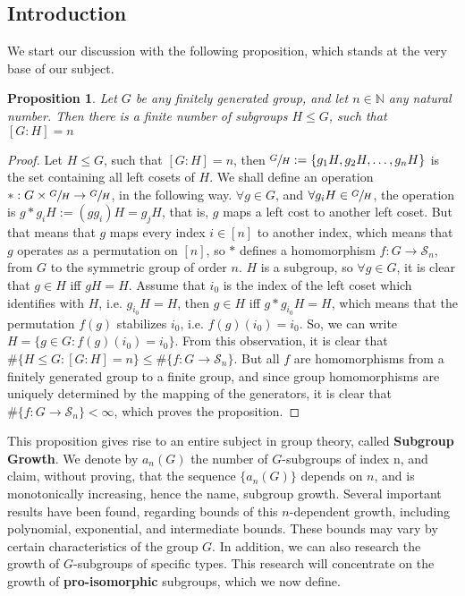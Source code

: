 \documentclass[12pt]{article}
\newtheorem{proposition}[theorem]{Proposition}
\begin{document}
\subsection{Introduction}
We start our discussion with the following proposition, which stands at the very base of our subject.
\begin{proposition} \label{prop:finite.number.subgroups}
Let $G$ be any finitely generated group, and let $n\in\mathbb{N}$ any natural number. Then there is a finite number of subgroups $H\leq G$, such that $[G:H]=n$
\end{proposition}
\begin{proof}
Let $H\leq G$, such that $[G:H]=n$, then $\sfrac{G}{H}:=\{g_1H,g_2H,\dots,g_nH\}$ is the set containing all left cosets of $H$. We shall define an operation $*:G\times\sfrac{G}{H}\rightarrow \sfrac{G}{H}$, in the following way. $\forall g\in G$, and $\forall g_iH\in\sfrac{G}{H}$, the operation is $g*g_iH:=(gg_i)H=g_jH$, that is, $g$ maps a left cost to another left coset. But that means that $g$ maps every index $i\in [n]$ to another index, which means that $g$ operates as a permutation on $[n]$, so $*$ defines a homomorphism $f:G\rightarrow\mathcal{S}_n$, from $G$ to the symmetric group of order $n$. $H$ is a subgroup, so $\forall g\in G$, it is clear that $g\in H$ iff $gH=H$. Assume that $i_0$  is the index of the left coset which identifies with $H$, i.e. $g_{i_0}H=H$, then $g\in H$ iff $g*g_{i_0}H=H$, which means that the permutation $f(g)$ stabilizes $i_0$, i.e. $f(g)(i_0)=i_0$. So, we can write $H=\{g\in G : f(g)(i_0)=i_0\}$. From this observation, it is clear that $\#\{H\leq G : [G:H]=n\}\leq\#\{f:G\rightarrow \mathcal{S}_n\}$. But all $f$ are homomorphisms from a finitely generated group to a finite group, and since group homomorphisms are uniquely determined by the mapping of the generators, it is clear that $\#\{f:G\rightarrow \mathcal{S}_n\}<\infty$, which proves the proposition.
\end{proof}
This proposition gives rise to an entire subject in group theory, called \textbf{Subgroup Growth}. We denote by $a_n(G)$ the number of $G$-subgroups of index n, and claim, without proving, that the sequence $\{a_n(G)\}$ depends on $n$, and is monotonically increasing, hence the name, subgroup growth. Several important results have been found, regarding bounds of this $n$-dependent growth, including polynomial, exponential, and intermediate bounds. These bounds may vary by certain characteristics of the group $G$. In addition, we can also research the growth of $G$-subgroups of specific types. This research will concentrate on the growth of \textbf{pro-isomorphic} subgroups, which we now define.
\end{document}
